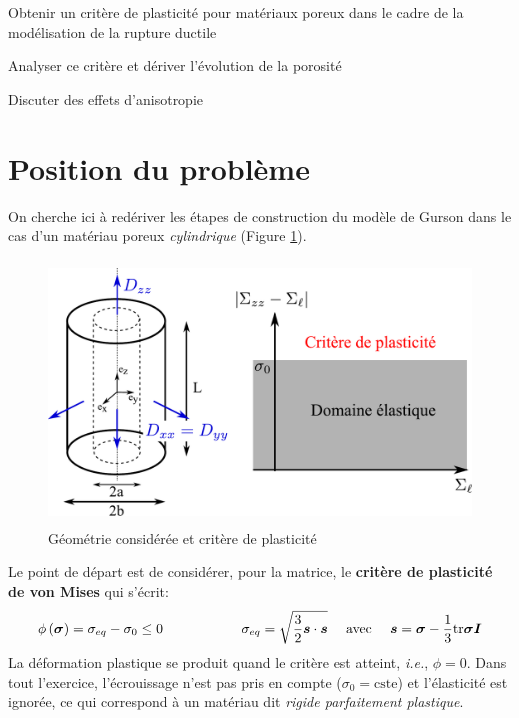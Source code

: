 \documentclass[french,12pt]{exam}
\begin{document}
\thispagestyle{empty}

\begin{objectifs}
\item Obtenir un critère de plasticité pour matériaux poreux dans le cadre de la modélisation de la rupture ductile
\item Analyser ce critère et dériver l'évolution de la porosité
\item Discuter des effets d'anisotropie
\end{objectifs}

\section{Position du problème}
On cherche ici à redériver les étapes de construction du modèle de Gurson dans le cas d'un matériau poreux \textit{cylindrique} (Figure \ref{fig1}).

\begin{figure}[H]
  \centering
  \includegraphics[height = 7cm]{homoMEALOR.pdf}
\caption{Géométrie considérée et critère de plasticité}
\label{fig1}
\end{figure}


Le point de départ est de considérer, pour la matrice, le \textbf{critère de plasticité de von Mises} qui s'écrit:
\begin{equation}
  \phi\left( \boldsymbol{\sigma}   \right) =  \sigma_{eq} - \sigma_0 \leq 0 \hspace{2cm} \sigma_{eq} = \sqrt{\frac{3}{2} \boldsymbol{s} \cdot \boldsymbol{s}} \ \ \ \ \mathrm{avec} \ \ \ \ \boldsymbol{s} = \boldsymbol{\sigma} - \frac{1}{3} \mathrm{tr}\boldsymbol{\sigma} \boldsymbol{I}
  \label{eq1}
\end{equation}
La déformation plastique se produit quand le critère est atteint, \textit{i.e.}, $\phi = 0$. Dans tout l'exercice, l'écrouissage n'est pas pris en compte ($\sigma_0 = \text{cste}$) et l'élasticité est ignorée, ce qui correspond à un matériau dit \textit{rigide parfaitement plastique}.
\end{document}
